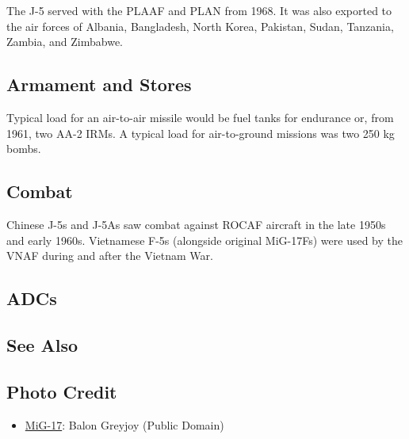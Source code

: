 The J-5 served with the PLAAF and PLAN from 1968. It was also exported to the air forces of Albania, Bangladesh, North Korea, Pakistan, Sudan, Tanzania, Zambia, and Zimbabwe.

\subsection{Armament and Stores}

Typical load for an air-to-air missile would be fuel tanks for endurance or, from 1961, two AA-2 IRMs. A typical load for air-to-ground missions was two 250 kg bombs.

\subsection{Combat}

Chinese J-5s and J-5As saw combat against ROCAF aircraft in the late 1950s and early 1960s. Vietnamese F-5s (alongside original MiG-17Fs) were used by the VNAF during and after the Vietnam War.

\subsection{ADCs}
\begin{adclist}
\end{adclist}

\subsection{See Also}
\begin{typelist}
\end{typelist}

\subsection{Photo Credit}
\begin{itemize}\raggedright
    \item \href{https://commons.wikimedia.org/wiki/File:MiG-17_Take_to_the_Skies_Airfest_Durant,_Oklahoma_4.jpg}{MiG-17}: Balon Greyjoy (Public Domain)
\end{itemize}
